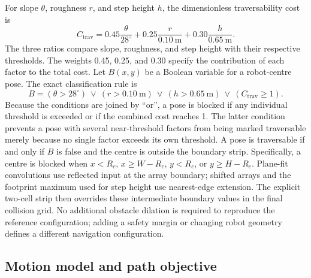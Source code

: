 \documentclass[11pt]{article}
\begin{document}
For slope $\theta$, roughness $r$, and step height $h$, the dimensionless
traversability cost is
\begin{equation}
  C_{\mathrm{trav}}=
  0.45\frac{\theta}{28^\circ}+
  0.25\frac{r}{0.10\ \mathrm{m}}+
  0.30\frac{h}{0.65\ \mathrm{m}}.
\end{equation}
The three ratios compare slope, roughness, and step height with their respective
thresholds. The weights 0.45, 0.25, and 0.30 specify the contribution of each
factor to the total cost.
Let $B(x,y)$ be a Boolean variable for a robot-centre pose. The exact
classification rule is
\begin{equation}
  B=(\theta>28^\circ)\ \lor\ (r>0.10\ \mathrm{m})\ \lor\
  (h>0.65\ \mathrm{m})\ \lor\ (C_{\mathrm{trav}}\geq1).
\end{equation}
Because the conditions are joined by ``or'', a pose is blocked if any
individual threshold is exceeded or if the combined cost reaches 1. The latter
condition prevents a pose with several near-threshold factors from being marked
traversable merely because no single factor exceeds its own threshold.
A pose is traversable if and only if $B$ is false and the centre is outside the
boundary strip. Specifically, a centre is blocked when $x<R_c$, $x\geq W-R_c$,
$y<R_c$, or $y\geq H-R_c$. Plane-fit convolutions use reflected input at the
array boundary; shifted arrays and the footprint maximum used for step height
use nearest-edge extension. The explicit two-cell strip then overrides these
intermediate boundary values in the final collision grid. No additional
obstacle dilation is required to reproduce the reference configuration; adding
a safety margin or changing robot geometry defines a different navigation
configuration.

\subsection{Motion model and path objective}
\end{document}
